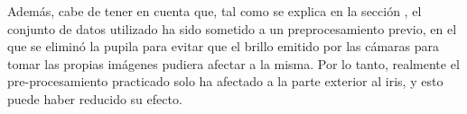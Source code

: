 Además, cabe de tener en cuenta que, tal como se explica en la sección , el conjunto de datos utilizado ha sido sometido a un preprocesamiento previo, en el que se eliminó la pupila 
para evitar que el brillo emitido por las cámaras para tomar las propias imágenes pudiera afectar a la misma. Por lo tanto, realmente el pre-procesamiento practicado solo ha afectado a la 
parte exterior al iris, y esto puede haber reducido su efecto.

